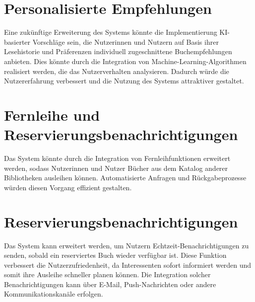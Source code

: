 \section{Personalisierte Empfehlungen}

Eine zukünftige Erweiterung des Systems könnte die Implementierung KI-basierter Vorschläge sein, die Nutzerinnen und Nutzern auf Basis ihrer Lesehistorie und Präferenzen individuell zugeschnittene Buchempfehlungen anbieten. Dies könnte durch die Integration von Machine-Learning-Algorithmen realisiert werden, die das Nutzerverhalten analysieren. Dadurch würde die Nutzererfahrung verbessert und die Nutzung des Systems attraktiver gestaltet.

\section{Fernleihe und Reservierungsbenachrichtigungen}

Das System könnte durch die Integration von Fernleihfunktionen erweitert werden, sodass Nutzerinnen und Nutzer Bücher aus dem Katalog anderer Bibliotheken ausleihen können. Automatisierte Anfragen und Rückgabeprozesse würden diesen Vorgang effizient gestalten. 


\section{Reservierungsbenachrichtigungen}
Das System kann erweitert werden, um Nutzern Echtzeit-Benachrichtigungen zu senden, sobald ein reserviertes Buch wieder verfügbar ist. Diese Funktion verbessert die Nutzerzufriedenheit, da Interessenten sofort informiert werden und somit ihre Ausleihe schneller planen können. Die Integration solcher Benachrichtigungen kann über E-Mail, Push-Nachrichten oder andere Kommunikationskanäle erfolgen.

